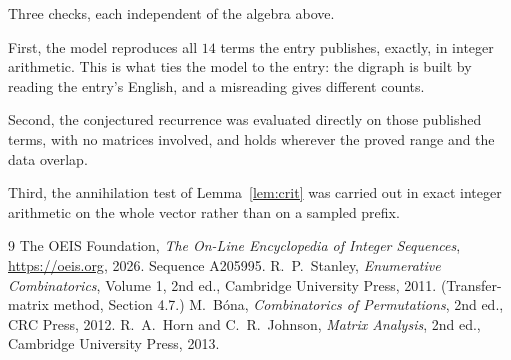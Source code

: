 \documentclass[11pt,a4paper]{article}
\theoremstyle{plain}
\theoremstyle{definition}
\begin{document}
Three checks, each independent of the algebra above.

First, the model reproduces all $14$ terms the entry publishes, exactly, in integer
arithmetic. This is what ties the model to the entry: the digraph is built by reading the
entry's English, and a misreading gives different counts.

Second, the conjectured recurrence was evaluated directly on those published terms, with no
matrices involved, and holds wherever the proved range and the data overlap.

Third, the annihilation test of Lemma~\ref{lem:crit} was carried out in exact integer
arithmetic on the whole vector rather than on a sampled prefix.

\begin{thebibliography}{9}
 The OEIS Foundation, \emph{The On-Line Encyclopedia of Integer
Sequences}, \url{https://oeis.org}, 2026. Sequence A205995.
 R.~P.~Stanley, \emph{Enumerative Combinatorics}, Volume 1, 2nd ed.,
Cambridge University Press, 2011. (Transfer-matrix method, Section 4.7.)
 M.~B\'ona, \emph{Combinatorics of Permutations}, 2nd ed., CRC
Press, 2012.
 R.~A.~Horn and C.~R.~Johnson, \emph{Matrix Analysis}, 2nd ed., Cambridge
University Press, 2013.
\end{thebibliography}
\end{document}
